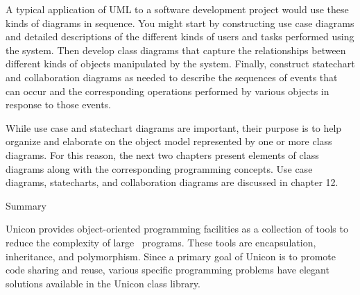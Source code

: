A typical application of UML to a software development project would use
these kinds of diagrams in sequence. You might start by constructing
use case diagrams and detailed descriptions of the different kinds of
users and tasks performed using the system. Then develop class diagrams
that capture the relationships between different kinds of objects
manipulated by the system. Finally, construct statechart and
collaboration diagrams as needed to describe the sequences of events
that can occur and the corresponding operations performed by various
objects in response to those events.

While use case and statechart diagrams are important, their purpose is
to help organize and elaborate on the object model represented by one
or more class diagrams. For this reason, the next two chapters present
elements of class diagrams along with the corresponding programming
concepts. Use case diagrams, statecharts, and collaboration diagrams
are discussed in chapter 12.

{\sffamily
Summary}

Unicon provides object-oriented programming facilities as a collection
of tools to reduce the complexity of large \ programs. These tools are
encapsulation, inheritance, and polymorphism. Since a primary goal of
Unicon is to promote code sharing and reuse, various specific
programming problems have elegant solutions available in the Unicon
class library.


\bigskip
